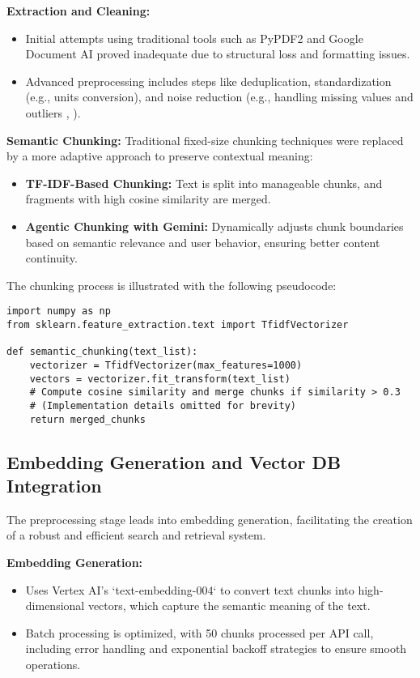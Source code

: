 \documentclass[conference]{IEEEtran}
\begin{document}
\textbf{Extraction and Cleaning:}
\begin{itemize}
    \item Initial attempts using traditional tools such as PyPDF2 and Google Document AI proved inadequate due to structural loss and formatting issues.
    \item Advanced preprocessing includes steps like deduplication, standardization (e.g., units conversion), and noise reduction (e.g., handling missing values and outliers \cite{1}, \cite{3}).
\end{itemize}

\textbf{Semantic Chunking:}
Traditional fixed-size chunking techniques were replaced by a more adaptive approach to preserve contextual meaning:
\begin{itemize}
    \item \textbf{TF-IDF-Based Chunking:} Text is split into manageable chunks, and fragments with high cosine similarity are merged.
    \item \textbf{Agentic Chunking with Gemini:} Dynamically adjusts chunk boundaries based on semantic relevance and user behavior, ensuring better content continuity.
\end{itemize}

The chunking process is illustrated with the following pseudocode:
\begin{lstlisting}
import numpy as np
from sklearn.feature_extraction.text import TfidfVectorizer

def semantic_chunking(text_list):
    vectorizer = TfidfVectorizer(max_features=1000)
    vectors = vectorizer.fit_transform(text_list)
    # Compute cosine similarity and merge chunks if similarity > 0.3
    # (Implementation details omitted for brevity)
    return merged_chunks
\end{lstlisting}

\subsection{Embedding Generation and Vector DB Integration}
The preprocessing stage leads into embedding generation, facilitating the creation of a robust and efficient search and retrieval system.

\textbf{Embedding Generation:}
\begin{itemize}
    \item Uses Vertex AI's `text-embedding-004` to convert text chunks into high-dimensional vectors, which capture the semantic meaning of the text.
    \item Batch processing is optimized, with 50 chunks processed per API call, including error handling and exponential backoff strategies to ensure smooth operations.
\end{itemize}
\end{document}
